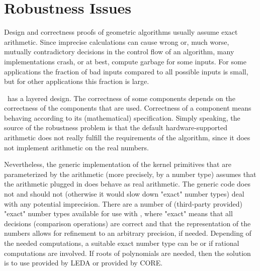 
\chapter{Robustness Issues\label{chap:robustness}}


Design and correctness proofs of geometric algorithms usually assume exact
arithmetic. Since imprecise calculations can cause wrong or, much worse,
mutually contradictory decisions in the control flow of an algorithm, many
implementations crash, or at best, compute garbage for some inputs. For
some applications the fraction of bad inputs compared to all possible
inputs is small, but for other applications this fraction is large.

\cgal\ has a layered design. The correctness of some components depends
on the correctness of the components that are used. Correctness of
a component means behaving according to its (mathematical) specification.
Simply speaking, the source of the robustness problem is that the default
hardware-supported arithmetic does not really fulfill the requirements of 
the algorithm, since it does not implement arithmetic on the real numbers.

Nevertheless, the generic implementation of the kernel primitives that are 
parameterized by the arithmetic (more precisely, by a number type)
assumes that the arithmetic plugged in does behave as real arithmetic.
The generic code does not and should not (otherwise it would slow down 
"exact" number types) deal with any potential imprecision. There are
a number of (third-party provided) "exact" number types available for use
with \cgal, where "exact" means
that all decisions (comparison operations) are correct and that the
representation of the numbers allows for refinement to an arbitrary precision, 
if needed. 
Depending of the needed computations, a suitable exact number type
can be  or  if rational computations
are involved. 
If roots of polynomials are needed, then the solution is to use 
  provided by LEDA or  provided by CORE.


